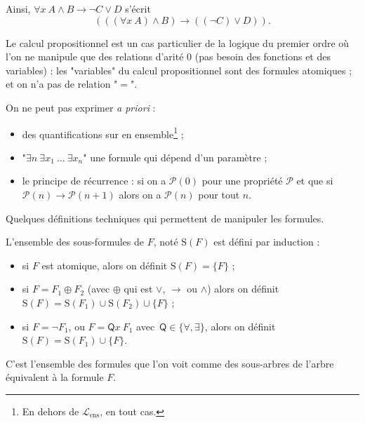 \documentclass[./main]{subfiles}
\begin{document}
  \begin{exm}
    Ainsi, $\forall x \: A \land B \to \lnot C \lor D$ s'écrit \[
      (((\forall x\:A) \land B) \to ((\lnot C) \lor D))
    .\]
  \end{exm}

  \begin{rmk}
    Le calcul propositionnel est un cas particulier de la logique du premier ordre
    où l'on ne manipule que des relations d'arité $0$ (pas besoin des fonctions et des variables) : les "variables" du calcul propositionnel sont des formules atomiques ; et on n'a pas de relation "$=$".
  \end{rmk}

  \begin{rmk}
    On ne peut pas exprimer \textit{a priori} :
    \begin{itemize}
      \item  des quantifications sur en ensemble\footnote{En dehors de $\mathcal{L}_\mathrm{ens}$, en tout cas.} ;
      \item "$\exists n\ \exists x_1\: \ldots \: \exists x_n $" une formule qui dépend d'un paramètre ;
      \item le principe de récurrence : si on a $\mathcal{P}(0)$ pour une propriété $\mathcal{P}$ et que si $\mathcal{P}(n) \to \mathcal{P}(n+1)$ alors on a $\mathcal{P}(n)$ pour tout $n$.
    \end{itemize}
  \end{rmk}

  Quelques définitions techniques qui permettent de manipuler les formules.

  \begin{defn}
    L'ensemble des sous-formules de $F$, noté $\mathrm{S}(F)$ est défini par induction :
    \begin{itemize}
      \item si $F$ est atomique, alors on définit $\mathrm{S}(F) = \{F\}$ ;
      \item si $F = F_1 \oplus F_2$ (avec $\oplus$ qui est $\lor$, $\to$ ou $\land$)
         alors on définit~ $\mathrm{S}(F) = \mathrm{S}(F_1) \cup \mathrm{S}(F_2) \cup \{F\}$ ;
      \item si $F = \lnot F_1$, ou $F = \mathsf{Q}x\: F_1$ avec~$\mathsf{Q} \in \{\forall, \exists\}$, alors on définit $\mathrm{S}(F) = \mathrm{S}(F_1) \cup \{F\}$.
    \end{itemize}
    C'est l'ensemble des formules que l'on voit comme des sous-arbres de l'arbre équivalent à la formule $F$.
  \end{defn}
\end{document}
